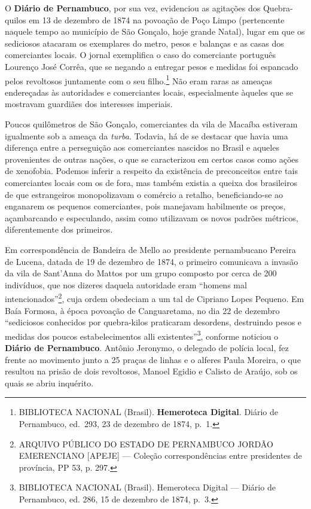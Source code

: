 \begin{refsection}
O \textbf{Diário de Pernambuco}, por sua vez, evidenciou as agitações dos Quebra-quilos em 13 de dezembro de 1874 na povoação de Poço Limpo (pertencente naquele tempo ao município de São Gonçalo, hoje grande Natal), lugar em que os sediciosos atacaram os exemplares do metro, pesos e balanças e as casas dos comerciantes locais. O jornal exemplifica o caso do comerciante português Lourenço José Corrêa, que se negando a entregar pesos e medidas foi espancado pelos revoltosos juntamente com o seu filho.\footnote{BIBLIOTECA NACIONAL (Brasil). \textbf{Hemeroteca Digital}. Diário de Pernambuco, ed.~293, 23 de dezembro de 1874, p.~1.} Não eram raras as ameaças endereçadas às autoridades e comerciantes locais, especialmente àqueles que se mostravam guardiães dos interesses imperiais.  

Poucos quilômetros de São Gonçalo, comerciantes da vila de Macaíba estiveram igualmente sob a ameaça da \textit{turba}. Todavia, há de se destacar que havia uma diferença entre a perseguição aos comerciantes nascidos no Brasil e aqueles provenientes de outras nações, o que se caracterizou em certos casos como ações de xenofobia. Podemos inferir a respeito da existência de preconceitos entre tais comerciantes locais com os de fora, mas também existia a queixa dos brasileiros de que estrangeiros monopolizavam o comércio a retalho, beneficiando-se ao enganarem os pequenos comerciantes, pois manejavam habilmente os preços, açambarcando e especulando, assim como utilizavam os novos padrões métricos, diferentemente dos primeiros. 

Em correspondência de Bandeira de Mello ao presidente pernambucano Pereira de Lucena, datada de 19 de dezembro de 1874, o primeiro comunicava a invasão da vila de Sant’Anna do Mattos por um grupo composto por cerca de 200 indivíduos, que nos dizeres daquela autoridade eram “homens mal intencionados”\footnote{ARQUIVO PÚBLICO DO ESTADO DE PERNAMBUCO JORDÃO EMERENCIANO [APEJE] --- Coleção correspondências entre presidentes de província, PP 53, p. 297.}, cuja ordem obedeciam a um tal de Cipriano Lopes Pequeno. Em Baía Formosa, à época povoação de Canguaretama, no dia 22 de dezembro “sediciosos conhecidos por quebra-kilos praticaram desordens, destruindo pesos e medidas dos poucos estabelecimentos alli existentes”\footnote{BIBLIOTECA NACIONAL (Brasil). Hemeroteca Digital --- Diário de Pernambuco, ed. 286, 15 de dezembro de 1874, p.~3.}, conforme noticiou o \textbf{Diário de Pernambuco}. Antônio Jeronymo, o delegado de polícia local, fez frente ao movimento junto a 25 praças de linhas e o alferes Paula Moreira, o que resultou na prisão de dois revoltosos, Manoel Egidio e Calisto de Araújo, sob os quais se abriu inquérito. 


\end{refsection}
